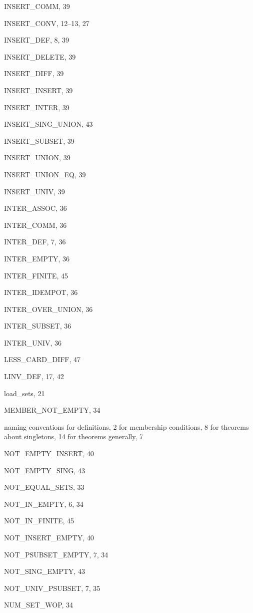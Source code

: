 \begin{theindex}
  \item {\ptt INSERT\_COMM}, 39
  \item {\ptt INSERT\_CONV}, 12--13, 27
  \item {\ptt INSERT\_DEF}, 8, 39
  \item {\ptt INSERT\_DELETE}, 39
  \item {\ptt INSERT\_DIFF}, 39
  \item {\ptt INSERT\_INSERT}, 39
  \item {\ptt INSERT\_INTER}, 39
  \item {\ptt INSERT\_SING\_UNION}, 43
  \item {\ptt INSERT\_SUBSET}, 39
  \item {\ptt INSERT\_UNION}, 39
  \item {\ptt INSERT\_UNION\_EQ}, 39
  \item {\ptt INSERT\_UNIV}, 39
  \item {\ptt INTER\_ASSOC}, 36
  \item {\ptt INTER\_COMM}, 36
  \item {\ptt INTER\_DEF}, 7, 36
  \item {\ptt INTER\_EMPTY}, 36
  \item {\ptt INTER\_FINITE}, 45
  \item {\ptt INTER\_IDEMPOT}, 36
  \item {\ptt INTER\_OVER\_UNION}, 36
  \item {\ptt INTER\_SUBSET}, 36
  \item {\ptt INTER\_UNIV}, 36

  \indexspace

  \item {\ptt LESS\_CARD\_DIFF}, 47
  \item {\ptt LINV\_DEF}, 17, 42
  \item {\ptt load\_sets}, 21

  \indexspace

  \item {\ptt MEMBER\_NOT\_EMPTY}, 34

  \indexspace

  \item naming conventions
    \subitem for definitions, 2
    \subitem for membership conditions, 8
    \subitem for theorems about singletons, 14
    \subitem for theorems generally, 7
  \item {\ptt NOT\_EMPTY\_INSERT}, 40
  \item {\ptt NOT\_EMPTY\_SING}, 43
  \item {\ptt NOT\_EQUAL\_SETS}, 33
  \item {\ptt NOT\_IN\_EMPTY}, 6, 34
  \item {\ptt NOT\_IN\_FINITE}, 45
  \item {\ptt NOT\_INSERT\_EMPTY}, 40
  \item {\ptt NOT\_PSUBSET\_EMPTY}, 7, 34
  \item {\ptt NOT\_SING\_EMPTY}, 43
  \item {\ptt NOT\_UNIV\_PSUBSET}, 7, 35
  \item {\ptt NUM\_SET\_WOP}, 34


\end{theindex}
